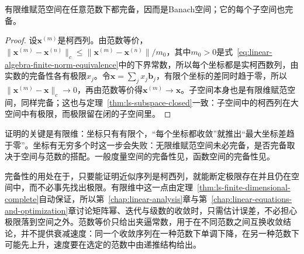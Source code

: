 \begin{theorem}[有限维赋范空间的完备性]
\label{thm:ls-finite-dimensional-complete}
有限维赋范空间在任意范数下都完备，因而是Banach空间；它的每个子空间也完备。
\end{theorem}
\begin{proof}
设$\bm x^{(m)}$是柯西列。由范数等价，$\lVert\bm x^{(m)}-\bm x^{(n)}\rVert_c\leq\lVert\bm x^{(m)}-\bm x^{(n)}\rVert/m_0$，其中$m_0>0$是式~\eqref{eq:linear-algebra-finite-norm-equivalence}中的下界常数，所以每个坐标都是实柯西数列，由实数的完备性各有极限$x_j$。令$\bm x=\sum_jx_j\bm b_j$，有限个坐标的差同时趋于零，所以$\lVert\bm x^{(m)}-\bm x\rVert_c\to0$，再由范数等价得$\bm x^{(m)}\to\bm x$。子空间本身也是有限维赋范空间，同样完备；这也与定理~\ref{thm:ls-subspace-closed}一致：子空间中的柯西列在大空间中有极限，而极限留在闭的子空间里。
\end{proof}
证明的关键是有限维：坐标只有有限个，“每个坐标都收敛”就推出“最大坐标差趋于零”。坐标有无穷多个时这一步会失败：无限维赋范空间未必完备，是否完备取决于空间与范数的搭配。一般度量空间的完备性见，函数空间的完备性见。

完备性的用处在于，只要能证明近似序列是柯西列，就能断定极限存在并且仍在空间中，而不必事先找出极限。有限维中这一点由定理~\ref{thm:ls-finite-dimensional-complete}自动保证，所以第~\ref{chap:linear-analysis}章与第~\ref{chap:linear-equations-and-optimization}章讨论矩阵幂、迭代与级数的收敛时，只需估计误差，不必担心极限落到空间之外。范数等价只给出夹逼常数，用于在不同范数之间互换收敛结论，并不提供衰减速度：同一个收敛序列在一种范数下单调下降，在另一种范数下可能先上升，速度要在选定的范数中由递推结构给出。
